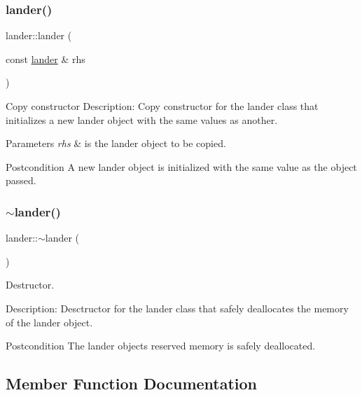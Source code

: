 \subsubsection{\texorpdfstring{lander()}{lander()}\hspace{0.1cm}{\footnotesize\ttfamily [3/3]}}
{\footnotesize\ttfamily lander\+::lander (\begin{DoxyParamCaption}\item[{const \hyperlink{classlander}{lander} \&}]{rhs }\end{DoxyParamCaption})}



Copy constructor Description\+: Copy constructor for the lander class that initializes a new lander object with the same values as another. 


\begin{DoxyParams}{Parameters}
{\em rhs} & is the lander object to be copied. \\
\hline
\end{DoxyParams}
\begin{DoxyPostcond}{Postcondition}
A new lander object is initialized with the same value as the object passed. 
\end{DoxyPostcond}
\mbox{\label{classlander_abadffd59954f62978cee21bc59e22cfa}} 
\subsubsection{\texorpdfstring{$\sim$lander()}{~lander()}}
{\footnotesize\ttfamily lander\+::$\sim$lander (\begin{DoxyParamCaption}{ }\end{DoxyParamCaption})}



Destructor. 

Description\+: Desctructor for the lander class that safely deallocates the memory of the lander object. \begin{DoxyPostcond}{Postcondition}
The lander objects reserved memory is safely deallocated. 
\end{DoxyPostcond}


\subsection{Member Function Documentation}
\mbox{\label{classlander_a47e887be0b3b8bb2f48f6913b2917ecf}} 
